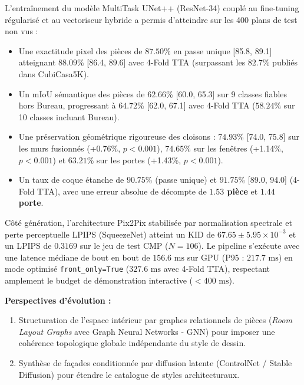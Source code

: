 \documentclass[11pt,a4paper]{report}
\begin{document}
L'entraînement du modèle MultiTask UNet++ (ResNet-34) couplé au fine-tuning régularisé et au vectoriseur hybride a permis d'atteindre sur les 400 plans de test non vus :
\begin{itemize}
    \item Une exactitude pixel des pièces de \textbf{$87.50\%$} en passe unique [85.8, 89.1] atteignant \textbf{$88.09\%$} [86.4, 89.6] avec 4-Fold TTA (surpassant les $82.7\%$ publiés dans CubiCasa5K).
    \item Un mIoU sémantique des pièces de \textbf{$62.66\%$} [60.0, 65.3] sur 9 classes fiables hors Bureau, progressant à \textbf{$64.72\%$} [62.0, 67.1] avec 4-Fold TTA ($58.24\%$ sur 10 classes incluant Bureau).
    \item Une préservation géométrique rigoureuse des cloisons : \textbf{$74.93\%$} [74.0, 75.8] sur les murs fusionnés (+0.76\%, $p < 0.001$), \textbf{$74.65\%$} sur les fenêtres (+1.14\%, $p < 0.001$) et \textbf{$63.21\%$} sur les portes (+1.43\%, $p < 0.001$).
    \item Un taux de coque étanche de \textbf{$90.75\%$} (passe unique) et \textbf{$91.75\%$} [89.0, 94.0] (4-Fold TTA), avec une erreur absolue de décompte de \textbf{$1.53$ pièce} et \textbf{$1.44$ porte}.
\end{itemize}
Côté génération, l'architecture Pix2Pix stabilisée par normalisation spectrale et perte perceptuelle LPIPS (SqueezeNet) atteint un KID de \textbf{$67.65 \pm 5.95 \times 10^{-3}$} et un LPIPS de \textbf{$0.3169$} sur le jeu de test CMP ($N=106$). Le pipeline s'exécute avec une latence médiane de bout en bout de \textbf{$156.6\text{ ms}$} sur GPU (P95 : $217.7\text{ ms}$) en mode optimisé \texttt{front\_only=True} ($327.6\text{ ms}$ avec 4-Fold TTA), respectant amplement le budget de démonstration interactive ($< 400\text{ ms}$).

\textbf{Perspectives d'évolution :}
\begin{enumerate}
    \item Structuration de l'espace intérieur par graphes relationnels de pièces (\emph{Room Layout Graphs} avec Graph Neural Networks - GNN) pour imposer une cohérence topologique globale indépendante du style de dessin.
    \item Synthèse de façades conditionnée par diffusion latente (ControlNet / Stable Diffusion) pour étendre le catalogue de styles architecturaux.
\end{enumerate}
\end{document}
